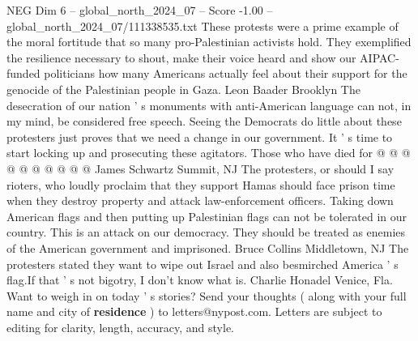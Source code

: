 \begin{textsample}{NEG Dim 6 – global\_north\_2024\_07 – Score -1.00 – global\_north\_2024\_07/111338535.txt}
These protests were a prime example of the moral fortitude that so many pro-Palestinian activists hold.
They exemplified the resilience necessary to shout, make their voice heard and show our AIPAC-funded politicians how many Americans actually feel about their support for the genocide of the Palestinian people in Gaza.
Leon Baader Brooklyn The desecration of our nation ' s monuments with anti-American language can not, in my mind, be considered free speech.
Seeing the Democrats do little about these protesters just proves that we need a change in our government.
It ' s time to start locking up and prosecuting these agitators.
Those who have died for @ @ @ @ @ @ @ @ @ @ James Schwartz Summit, NJ The protesters, or should I say rioters, who loudly proclaim that they support Hamas should face prison time when they destroy property and attack law-enforcement officers.
Taking down American flags and then putting up Palestinian flags can not be tolerated in our country.
This is an attack on our democracy.
They should be treated as enemies of the American government and imprisoned.
Bruce Collins Middletown, NJ The protesters stated they want to wipe out Israel and also besmirched America ' s flag.If that ' s not bigotry, I don't know what is.
Charlie Honadel Venice, Fla.
Want to weigh in on today ' s stories?
Send your thoughts ( along with your full name and city of \textbf{residence} ) to letters@nypost.com.
Letters are subject to editing for clarity, length, accuracy, and style.

\end{textsample}
